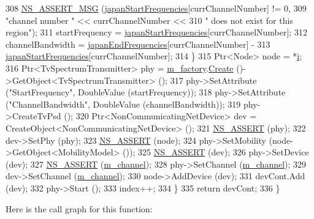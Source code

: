 \begin{DoxyCode}
308           \hyperlink{assert_8h_aff5ece9066c74e681e74999856f08539}{NS\_ASSERT\_MSG} (\hyperlink{namespacens3_a88b726d85e0f1f604a83f713b8e06105}{japanStartFrequencies}[currChannelNumber] != 0,
309                          \textcolor{stringliteral}{"channel number "} << currChannelNumber <<
310                          \textcolor{stringliteral}{" does not exist for this region"});
311           startFrequency = \hyperlink{namespacens3_a88b726d85e0f1f604a83f713b8e06105}{japanStartFrequencies}[currChannelNumber];    
312           channelBandwidth = \hyperlink{namespacens3_aa98ca716c08dfdb6a374ee8d09d18119}{japanEndFrequencies}[currChannelNumber] - 
313                              \hyperlink{namespacens3_a88b726d85e0f1f604a83f713b8e06105}{japanStartFrequencies}[currChannelNumber];
314         \}
315       Ptr<Node> node = *\hyperlink{bernuolliDistribution_8m_a6f6ccfcf58b31cb6412107d9d5281426}{i};
316       Ptr<TvSpectrumTransmitter> phy = \hyperlink{classns3_1_1TvSpectrumTransmitterHelper_ae89194664bc52ed899f7dd0d074e588c}{m\_factory}.\hyperlink{classns3_1_1ObjectFactory_a18152e93f0a6fe184ed7300cb31e9896}{Create} ()->GetObject<TvSpectrumTransmitter>
       ();
317       phy->SetAttribute (\textcolor{stringliteral}{"StartFrequency"}, DoubleValue (startFrequency));
318       phy->SetAttribute (\textcolor{stringliteral}{"ChannelBandwidth"}, DoubleValue (channelBandwidth));
319       phy->CreateTvPsd ();
320       Ptr<NonCommunicatingNetDevice> dev = CreateObject<NonCommunicatingNetDevice> ();
321       \hyperlink{assert_8h_a6dccdb0de9b252f60088ce281c49d052}{NS\_ASSERT} (phy);
322       dev->SetPhy (phy);
323       \hyperlink{assert_8h_a6dccdb0de9b252f60088ce281c49d052}{NS\_ASSERT} (node);
324       phy->SetMobility (node->GetObject<MobilityModel> ());
325       \hyperlink{assert_8h_a6dccdb0de9b252f60088ce281c49d052}{NS\_ASSERT} (dev);
326       phy->SetDevice (dev);
327       \hyperlink{assert_8h_a6dccdb0de9b252f60088ce281c49d052}{NS\_ASSERT} (\hyperlink{classns3_1_1TvSpectrumTransmitterHelper_afc92164bf4a2a99985189207ee3a53a8}{m\_channel});
328       phy->SetChannel (\hyperlink{classns3_1_1TvSpectrumTransmitterHelper_afc92164bf4a2a99985189207ee3a53a8}{m\_channel});
329       dev->SetChannel (\hyperlink{classns3_1_1TvSpectrumTransmitterHelper_afc92164bf4a2a99985189207ee3a53a8}{m\_channel});
330       node->AddDevice (dev);
331       devCont.Add (dev);
332       phy->Start ();
333       index++;
334     \}
335   \textcolor{keywordflow}{return} devCont;
336 \}
\end{DoxyCode}


Here is the call graph for this function\+:



